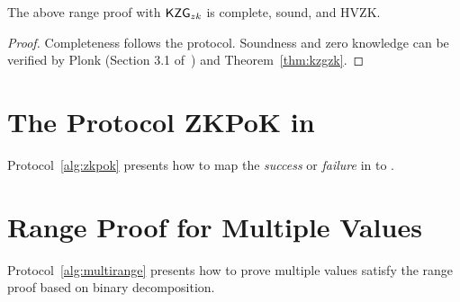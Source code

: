 \begin{theorem}
The above range proof with $\mathsf{KZG}_{zk}$ is complete, sound, and HVZK.
\end{theorem}
\begin{proof}
Completeness follows the protocol. Soundness and zero knowledge can be verified by Plonk (Section 3.1 of~\cite{plonk}) and Theorem~\ref{thm:kzgzk}.
\end{proof}

\section{The Protocol ZKPoK in \bootstrap}
\label{alg:map}

Protocol~\ref{alg:zkpok} presents how to map the \textit{success} or \textit{failure} in \secp to \bls.

\FloatBarrier

\FloatBarrier

\section{Range Proof for Multiple Values}
\label{alg:rpmv}

Protocol~\ref{alg:multirange} presents how to prove multiple values satisfy the range proof based on binary decomposition.

\FloatBarrier

\FloatBarrier
